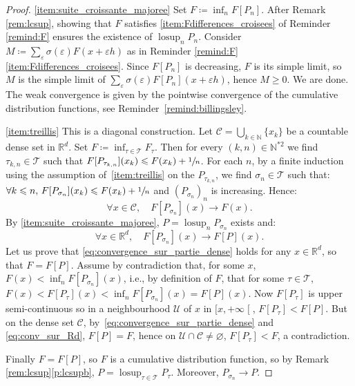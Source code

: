 \documentclass[11pt]{article}
\newcommand{\ie}{i.e.,\xspace}
\newcommand{\skpt}{\smallskip}
\theoremstyle{plain}
\theoremstyle{definition}
\newcommand{\Tt}{{\mathcal T}}
\newcommand{\eqdef}{\coloneqq}
\let\eps\varepsilon
\newcommand{\R}{\mathbb{R}}
\newcommand{\N}{\mathbb{N}}
\newcommand{\lcsup}{\operatorname{losup}}
\newcommand{\clo}{\mathclose}
\begin{document}
\skpt
\begin{proof}
\eqref{item:suite_croissante_majoree}
Set $F\eqdef\inf_nF[P_n]$. After Remark \ref{rem:lcsup}, showing that $F$ satisfies \eqref{item:Fdifferences_croisees} of Reminder \ref{remind:F} ensures the existence of $\lcsup_nP_n$. Consider $M\eqdef\sum_{\eps} \sigma(\eps) F(x+\eps h)$ as in Reminder \ref{remind:F}\eqref{item:Fdifferences_croisees}. Since $F[P_n]$ is decreasing, $F$ is its simple limit, so $M$ is the simple limit of $\sum_{\eps} \sigma(\eps) F[P_n](x+\eps h)$, hence $M\geqslant0$. We are done. The weak convergence is given by the pointwise convergence of the cumulative distribution functions, see Reminder~\ref{remind:billingsley}.

\eqref{item:treillis}
This is a diagonal construction. Let $\mathcal{C}=\bigcup_{k\in\N}\{x_k\}$ be a countable dense set in $\R^d$. Set $F\eqdef\inf_{\tau\in\Tt}F_\tau$. Then for every $(k,n)\in\N^{\ast2}$ we find $\tau_{k,n}\in \Tt$ such that $F[P_{\tau_{k,n}}](x_k)\leqslant F(x_k)+\sfrac1n$. For each $n$, by a finite induction using the assumption of~\eqref{item:treillis} on the $P_{\tau_{k,n}}$, we find $\sigma_{n}\in \Tt$ such that: $\forall k\leqslant n,\, F[P_{\sigma_{n}}](x_k)\leqslant F(x_k)+\sfrac1n$ and $(P_{\sigma_n})_n$ is increasing. Hence:
\begin{equation}\label{eq:convergence_sur_partie_dense}
\forall x\in \mathcal{C},\quad F[P_{\sigma_{n}}](x)\to F(x).
\end{equation}
By \eqref{item:suite_croissante_majoree}, $P=\lcsup_n P_{\sigma_n}$ exists and:
\begin{equation}\label{eq:conv_sur_Rd}
\forall x\in \R^d,\quad F[P_{\sigma_{n}}](x)\to F[P](x).
\end{equation}
Let us prove that \eqref{eq:convergence_sur_partie_dense} holds for any $x\in\R^d$, so that $F=F[P]$. Assume by contradiction that, for some $x$, $F(x)<\inf_nF[P_{\sigma_n}](x)$, \ie by definition of $F$, that for some $\tau\in\Tt$, $F(x)<F[P_\tau](x)<\inf_nF[P_{\sigma_n}](x)=F[P](x)$. Now $F[P_\tau]$ is upper semi-continuous so in a neighbourhood $\mathcal{U}$ of $x$ in $[x,+\infty\clo[$, $F[P_\tau]<F[P]$. But on the dense set $\mathcal{C}$, by~\eqref{eq:convergence_sur_partie_dense} and \eqref{eq:conv_sur_Rd}, $F[P]=F$, hence on $\mathcal{U}\cap\mathcal{C}\neq\varnothing$, $F[P_\tau]<F$, a contradiction.

Finally $F=F[P]$, so $F$ is a cumulative distribution function, so by Remark \ref{rem:lcsup}\eqref{p:lcsupb}, $P=\lcsup_{\tau\in\Tt}P_{\tau}$. Moreover, $P_{\sigma_n}\to P$.
\end{proof}
\end{document}
